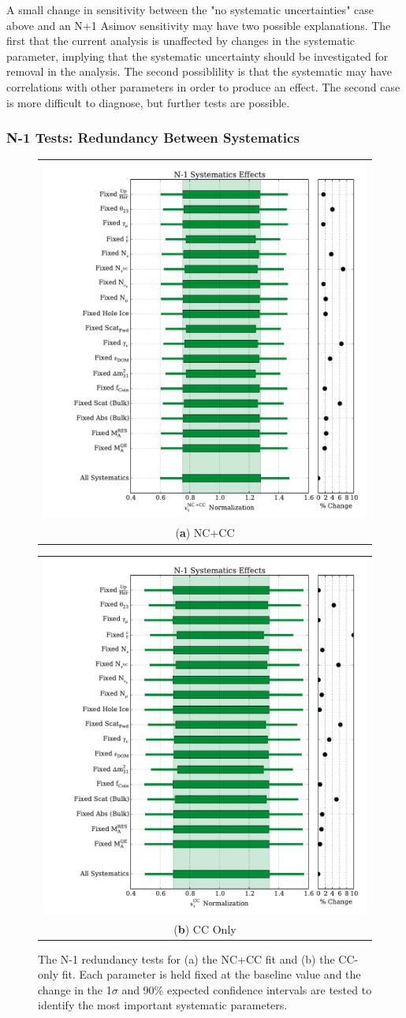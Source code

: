 A small change in sensitivity between the "no systematic uncertainties" case above and an N+1 Asimov sensitivity may have two possible explanations.
The first that the current analysis is unaffected by changes in the systematic parameter, implying that the systematic uncertainty should be investigated for removal in the analysis.
The second possiblility is that the systematic may have correlations with other parameters in order to produce an effect.
The second case is more difficult to diagnose, but further tests are possible.

\subsubsection{N-1 Tests: Redundancy Between Systematics}
\begin{figure}[h]
\centering
\begin{tabular}[b]{c}
  \includegraphics[width=0.45\linewidth]{n-1_widths_nc_cc.pdf} \\
  \small (\textbf{\color{ctcolormain}a}) NC+CC
\end{tabular} \hspace{2pt}
\begin{tabular}[b]{c}
  \includegraphics[width=0.45\linewidth]{n-1_widths_cc.pdf} \\
  \small (\textbf{\color{ctcolormain}b}) CC Only
\end{tabular}
\caption[The N-1 redundancy tests]{The N-1 redundancy tests for (a) the NC+CC fit and (b) the CC-only fit. Each parameter is held fixed at the baseline value and the change in the 1$\sigma$ and 90\% expected confidence intervals are tested to identify the most important systematic parameters.}
\label{fig:n-1_tests}
\end{figure}

